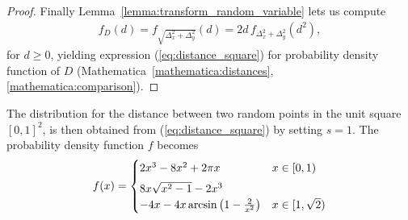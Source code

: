 \begin{proof}
  Finally Lemma~\ref{lemma:transform_random_variable} lets us compute
  \begin{align*}%
  f_D(d) = f_{\sqrt{\Delta_x^2 + \Delta_y^2}}(d) = 2d\, f_{\Delta_x^2 +
    \Delta_y^2}(d^2),
  \end{align*}
  for $d \geq 0$, yielding expression (\ref{eq:distance_square}) for
   probability density function of $D$
   (Mathematica~\ref{mathematica:distances}, \ref{mathematica:comparison}). 
\end{proof}

The distribution for the distance between two random points in the
unit square $[0,1]^2$, is then obtained from
(\ref{eq:distance_square}) by setting $s=1$. The probability
density function $f$ becomes
  \begin{align}\label{eq:distance_unit_square}
    f(x) = %
      \begin{cases} 
        2 x^3 - 8 x^2 +  2 \pi x 
          & x \in [0,1) \vspace{0.15cm}\\ 
        8x \sqrt{x^2-1}-2x^3\\ 
        -4x- 4x\arcsin\left(1-\frac{2}{x^2}\right) 
          & x \in [1,\sqrt{2})
           \end{cases}
  \end{align}
 
